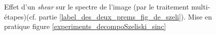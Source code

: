 \begin{figure}
		\caption{Effet d'un \emph{shear} sur le spectre de l'image (par le traitement multi-étapes)(cf. partie \ref{label_des_deux_prems_fig_de_szeli}). Mise en pratique figure \ref{experiments_decompoSzeliski_sinc} }
		\label{szeliski_decompoSzeliski}
	\end{figure}
	

